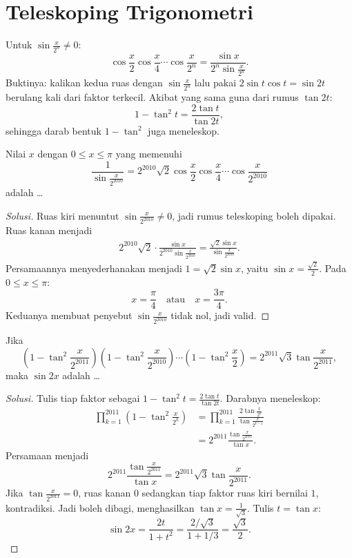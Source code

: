 \documentclass[12pt]{scrartcl}
\begin{document}
\section{Teleskoping Trigonometri}

\begin{theorem}
Untuk $\sin\frac{x}{2^n} \ne 0$:
\[ \cos\frac{x}{2}\cos\frac{x}{4}\cdots\cos\frac{x}{2^n}
= \frac{\sin x}{2^n\sin\frac{x}{2^n}}. \]
Buktinya: kalikan kedua ruas dengan $\sin\frac{x}{2^n}$ lalu pakai
$2\sin t\cos t = \sin 2t$ berulang kali dari faktor terkecil.
Akibat yang sama guna dari rumus $\tan 2t$:
\[ 1 - \tan^2 t = \frac{2\tan t}{\tan 2t}, \]
sehingga darab bentuk $1 - \tan^2$ juga meneleskop.
\end{theorem}

\begin{example}[OSK 2010]
Nilai $x$ dengan $0 \le x \le \pi$ yang memenuhi
\[ \frac{1}{\sin\frac{x}{2^{2010}}}
= 2^{2010}\sqrt{2}\cos\frac{x}{2}\cos\frac{x}{4}\cdots\cos\frac{x}{2^{2010}} \]
adalah \dots
\end{example}
\begin{proof}[Solusi]
Ruas kiri menuntut $\sin\frac{x}{2^{2010}} \ne 0$, jadi rumus teleskoping boleh dipakai.
Ruas kanan menjadi
\begin{align*}
2^{2010}\sqrt{2} \cdot \frac{\sin x}{2^{2010}\sin\frac{x}{2^{2010}}}
= \frac{\sqrt{2}\sin x}{\sin\frac{x}{2^{2010}}}.
\end{align*}
Persamaannya menyederhanakan menjadi $1 = \sqrt{2}\sin x$, yaitu
$\sin x = \frac{\sqrt{2}}{2}$. Pada $0 \le x \le \pi$:
\[ x = \frac{\pi}{4} \quad \text{atau} \quad x = \frac{3\pi}{4}. \]
Keduanya membuat penyebut $\sin\frac{x}{2^{2010}}$ tidak nol, jadi valid.
\end{proof}

\begin{example}[OSP 2011]
Jika
\[ \left(1-\tan^2\frac{x}{2^{2011}}\right)\left(1-\tan^2\frac{x}{2^{2010}}\right)
\cdots\left(1-\tan^2\frac{x}{2}\right) = 2^{2011}\sqrt{3}\tan\frac{x}{2^{2011}}, \]
maka $\sin 2x$ adalah \dots
\end{example}
\begin{proof}[Solusi]
Tulis tiap faktor sebagai $1 - \tan^2 t = \frac{2\tan t}{\tan 2t}$.
Darabnya meneleskop:
\begin{align*}
\prod_{k=1}^{2011}\left(1-\tan^2\frac{x}{2^k}\right)
&= \prod_{k=1}^{2011}\frac{2\tan\frac{x}{2^k}}{\tan\frac{x}{2^{k-1}}} \\
&= 2^{2011}\frac{\tan\frac{x}{2^{2011}}}{\tan x}.
\end{align*}
Persamaan menjadi
\[ 2^{2011}\frac{\tan\frac{x}{2^{2011}}}{\tan x}
= 2^{2011}\sqrt{3}\tan\frac{x}{2^{2011}}. \]
Jika $\tan\frac{x}{2^{2011}} = 0$, ruas kanan $0$ sedangkan tiap faktor ruas kiri
bernilai $1$, kontradiksi. Jadi boleh dibagi, menghasilkan $\tan x = \frac{1}{\sqrt{3}}$.
Tulis $t = \tan x$:
\[ \sin 2x = \frac{2t}{1+t^2} = \frac{2/\sqrt{3}}{1+1/3} = \frac{\sqrt{3}}{2}. \]
\end{proof}
\end{document}

